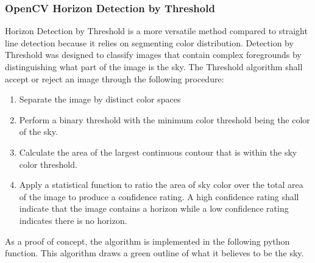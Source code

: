 \documentclass[onecolumn, draftclsnofoot,10pt, compsoc]{IEEEtran}
\begin{document}
\begin{singlespace}
				\subsubsection{OpenCV Horizon Detection by Threshold}
					Horizon Detection by Threshold is a more versatile method compared to straight line detection because it relies on segmenting color distribution.
		Detection by Threshold was designed to classify images that contain complex foregrounds by distinguishing what part of the image is the sky.
		The Threshold algorithm shall accept or reject an image through the following procedure:
					\begin{enumerate}
						\item Separate the image by distinct color spaces
						\item Perform a binary threshold with the minimum color threshold being the color of the sky.
						\item Calculate the area of the largest continuous contour that is within the sky color threshold.
						\item Apply a statistical function to ratio the area of sky color over the total area of the image to produce a confidence rating.
		A high confidence rating shall indicate that the image contains a horizon while a low confidence rating indicates there is no horizon.
					\end{enumerate}

					As a proof of concept, the algorithm is implemented in the following python function.
		This algorithm draws a green outline of what it believes to be the sky.

					


\end{singlespace}
\end{document}
